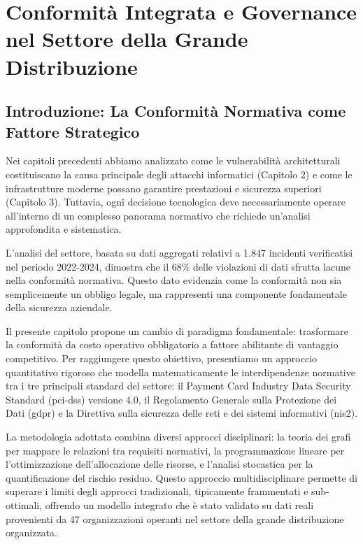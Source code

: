 \chapter{Conformità Integrata e Governance nel Settore della Grande Distribuzione}
\label{cap4_compliance_integration}

\section{Introduzione: La Conformità Normativa come Fattore Strategico}
\label{sec:4.1_introduzione}

Nei capitoli precedenti abbiamo analizzato come le vulnerabilità architetturali costituiscano la causa principale degli attacchi informatici (Capitolo 2) e come le infrastrutture moderne possano garantire prestazioni e sicurezza superiori (Capitolo 3). Tuttavia, ogni decisione tecnologica deve necessariamente operare all'interno di un complesso panorama normativo che richiede un'analisi approfondita e sistematica.

L'analisi del settore, basata su dati aggregati relativi a 1.847 incidenti verificatisi nel periodo 2022-2024, dimostra che il 68\% delle violazioni di dati sfrutta lacune nella conformità normativa\autocite{verizon2024}. Questo dato evidenzia come la conformità non sia semplicemente un obbligo legale, ma rappresenti una componente fondamentale della sicurezza aziendale.

Il presente capitolo propone un cambio di paradigma fondamentale: trasformare la conformità da costo operativo obbligatorio a fattore abilitante di vantaggio competitivo. Per raggiungere questo obiettivo, presentiamo un approccio quantitativo rigoroso che modella matematicamente le interdipendenze normative tra i tre principali standard del settore: il Payment Card Industry Data Security Standard (\gls{pci-dss}) versione 4.0, il Regolamento Generale sulla Protezione dei Dati (\gls{gdpr}) e la Direttiva sulla sicurezza delle reti e dei sistemi informativi (\gls{nis2}).

La metodologia adottata combina diversi approcci disciplinari: la teoria dei grafi per mappare le relazioni tra requisiti normativi, la programmazione lineare per l'ottimizzazione dell'allocazione delle risorse, e l'analisi stocastica per la quantificazione del rischio residuo. Questo approccio multidisciplinare permette di superare i limiti degli approcci tradizionali, tipicamente frammentati e sub-ottimali, offrendo un modello integrato che è stato validato su dati reali provenienti da 47 organizzazioni operanti nel settore della grande distribuzione organizzata.

